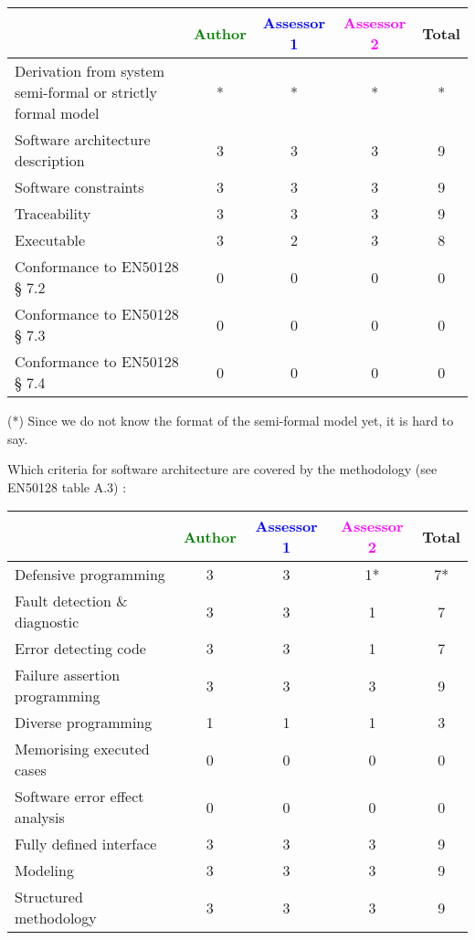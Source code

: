 \begin{tabular}{|l | c | c | c | c|}
\hline
& \textcolor{green}{Author} & \textcolor{blue}{Assessor 1} & \textcolor{magenta}{Assessor 2} & Total \\
\hline
Derivation from system semi-formal or strictly formal model  &* &* & *& * \\
\hline 
Software architecture description  &3 &3 & 3& 9 \\
\hline
Software constraints  &3 &3 & 3& 9 \\
\hline
Traceability  &3 &3 & 3& 9 \\
\hline
Executable  &3 &2 & 3& 8 \\
\hline
Conformance to EN50128 § 7.2  &0 &0 & 0& 0 \\
\hline
Conformance to EN50128 § 7.3  &0 &0 & 0& 0 \\
\hline
Conformance to EN50128 § 7.4  &0 &0 & 0& 0 \\
\hline
\end{tabular}
\begin{author_comment}
(*) Since we do not know the format of the semi-formal model  yet, it is hard to say.
\end{author_comment}

Which criteria for software architecture are covered by the methodology
(see EN50128 table A.3) :

\begin{tabular}{|l | c | c | c | c|}
\hline
& \textcolor{green}{Author} & \textcolor{blue}{Assessor 1} & \textcolor{magenta}{Assessor 2} & Total \\
\hline
Defensive programming  &3 &3 & 1*& 7* \\
\hline 
Fault detection \& diagnostic  &3 &3 & 1& 7 \\
\hline
Error detecting code  &3 &3 & 1& 7 \\
\hline
Failure assertion programming &3 &3 & 3& 9 \\
\hline
Diverse programming &1 &1 & 1& 3 \\
\hline
Memorising executed cases &0 &0 & 0& 0 \\
\hline
Software error effect analysis &0 &0 & 0& 0 \\
\hline
Fully defined interface &3 &3 & 3& 9 \\
\hline
Modeling  &3 &3 & 3& 9 \\
\hline
Structured methodology &3 &3 & 3& 9 \\
\hline
\end{tabular}

